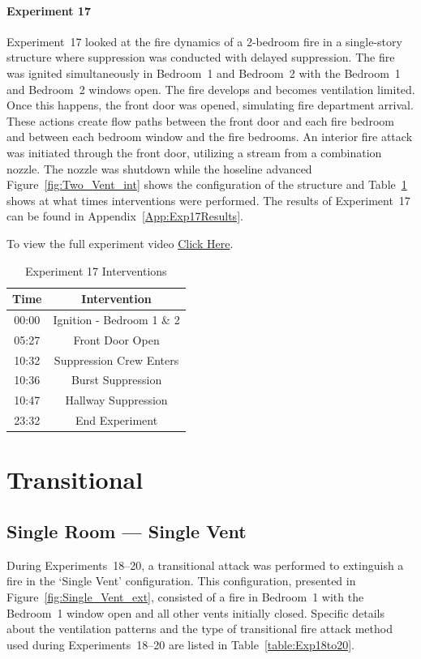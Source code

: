 \documentclass[12pt,oneside]{book}
\begin{document}
\paragraph{Experiment 17}
Experiment~17 looked at the fire dynamics of a 2-bedroom fire in a single-story structure where suppression was conducted with delayed suppression. The fire was ignited simultaneously in Bedroom~1 and Bedroom~2 with the Bedroom~1 and Bedroom~2 windows open. The fire develops and becomes ventilation limited. Once this happens, the front door was opened, simulating fire department arrival. These actions create flow paths between the front door and each fire bedroom and between each bedroom window and the fire bedrooms. An interior fire attack was initiated through the front door, utilizing a stream from a combination nozzle. The nozzle was shutdown while the hoseline advanced Figure~\ref{fig:Two_Vent_int} shows the configuration of the structure and Table~\ref{Table:Exp17Interventions} shows at what times interventions were performed. The results of Experiment~17 can be found in Appendix~\ref{App:Exp17Results}. 

To view the full experiment video \href{https://player.vimeo.com/video/170499615?autoplay=1}{Click Here}.

\begin{table}[H]
	\centering
	\caption{Experiment 17 Interventions}
	\begin{tabular}{|c|c|} 
		\hline
		Time & Intervention \\ \hline \hline
		00:00 & Ignition - Bedroom 1 \& 2 \\ \hline
		05:27 & Front Door Open \\ \hline
		10:32 & Suppression Crew Enters\\ \hline
		10:36 & Burst Suppression \\ \hline 
		10:47 & Hallway Suppression \\ \hline
		23:32 & End Experiment\\ \hline
	\end{tabular}
	\label{Table:Exp17Interventions}
\end{table}

\clearpage

\section{Transitional}

\subsection{Single Room --- Single Vent}
During Experiments~18--20, a transitional attack was performed to extinguish a fire in the `Single Vent' configuration. This configuration, presented in Figure~\ref{fig:Single_Vent_ext}, consisted of a fire in Bedroom~1 with the Bedroom~1 window open and all other vents initially closed. Specific details about the ventilation patterns and the type of transitional fire attack method used during Experiments~18--20 are listed in Table~\ref{table:Exp18to20}. 
\end{document}
